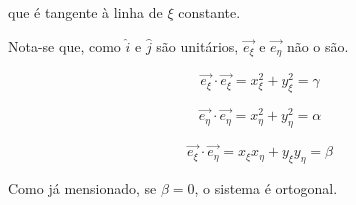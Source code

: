que é tangente à linha de $\xi$ constante.

Nota-se que, como $\hat{i}$ e $\hat{j}$ são unitários, $\vec{e_\xi}$ e $\vec{e_\eta}$ não o são.

\begin{equation}
    \label{eq:3.26}
    \vec{e_\xi} \cdot \vec{e_\xi} = x_\xi^2 + y_\xi^2 = \gamma
\end{equation}

\begin{equation}
    \label{eq:3.27}
    \vec{e_\eta} \cdot \vec{e_\eta} = x_\eta^2 + y_\eta^2 = \alpha
\end{equation}

\begin{equation}
    \label{eq:3.28}
    \vec{e_\xi} \cdot \vec{e_\eta} = x_\xi x_\eta + y_\xi y_\eta = \beta
\end{equation}

Como já mensionado, se $\beta = 0$, o sistema é ortogonal.